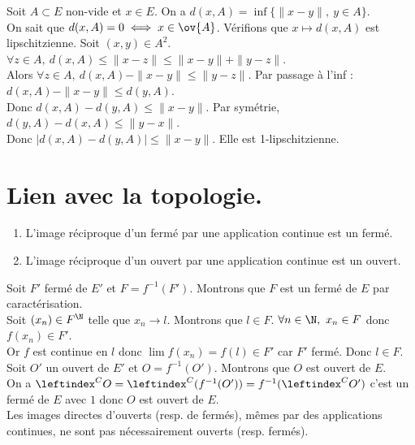 \documentclass[11pt]{article}
\begin{document}
\begin{ex}{}{}
    Soit $A\subset E$ non-vide et $x\in E$. On a $d(x,A)=\inf\{\|x-y\|, ~ y \in A\}$.\\
    On sait que $d(x,A)=0 \iff x \in \ov{A}$. Vérifions que $x\mapsto d(x,A)$ est lipschitzienne.
    \tcblower
    Soit $(x,y)\in A^2$. $\forall z \in A, ~ d(x,A) \leq \|x-z\| \leq \|x-y\| + \|y-z\|$.\\
    Alors $\forall z \in A, ~ d(x,A) - \|x-y\| \leq \|y-z\|$. Par passage à l'inf : $d(x,A)-\|x-y\|\leq d(y,A)$.\\
    Donc $d(x,A) - d(y,A) \leq \|x-y\|$. Par symétrie, $d(y,A)-d(x,A)\leq\|y-x\|$.\\
    Donc $|d(x,A)-d(y,A)|\leq\|x-y\|$. Elle est 1-lipschitzienne.
\end{ex}

\vspace*{-0.7cm}

\section{Lien avec la topologie.}

\begin{thm}{}{}
    \begin{enumerate}
        \item L'image réciproque d'un fermé par une application continue est un fermé.
        \item L'image réciproque d'un ouvert par une application continue est un ouvert.
    \end{enumerate}
    \tcblower
     Soit $F'$ fermé de $E'$ et $F=f^{-1}(F')$. Montrons que $F$ est un fermé de $E$ par caractérisation.\\
    Soit $(x_n)\in F^\N$ telle que $x_n\to l$. Montrons que $l \in F$. $\forall n \in \N, ~ x_n \in F$ donc $f(x_n) \in F'$.\\
    Or $f$ est continue en $l$ donc $\lim f(x_n) = f(l) \in F'$ car $F'$ fermé. Donc $l\in F$.\\
     Soit $O'$ un ouvert de $E'$ et $O=f^{-1}(O')$. Montrons que $O$ est ouvert de $E$.\\
    On a $\leftindex^CO=\leftindex^C(f^{-1}(O'))=f^{-1}(\leftindex^CO')$ c'est un fermé de $E$ avec $\boxed{1}$ donc $O$ est ouvert de $E$.\\
    \warning Les images directes d'ouverts (resp. de fermés), mêmes par des applications continues, ne sont pas nécessairement ouverts (resp. fermés).
\end{thm}
\end{document}
